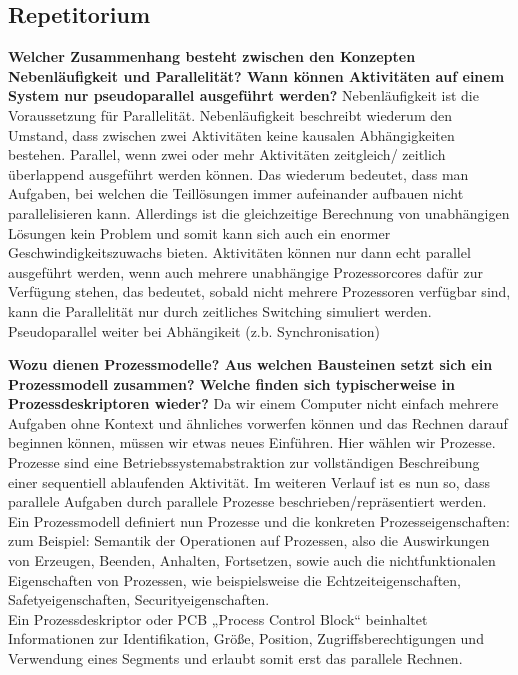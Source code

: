 \documentclass[a4paper]{article}
\begin{document}
\subsection{Repetitorium}
\begin{itemize*}
    \item \textbf{Welcher Zusammenhang besteht zwischen den Konzepten Nebenläufigkeit und Parallelität? Wann können Aktivitäten auf einem System nur pseudoparallel ausgeführt werden?} Nebenläufigkeit ist die Voraussetzung für Parallelität. Nebenläufigkeit beschreibt wiederum den Umstand, dass zwischen zwei Aktivitäten keine kausalen Abhängigkeiten bestehen. Parallel, wenn zwei oder mehr Aktivitäten zeitgleich/ zeitlich überlappend ausgeführt werden können. Das wiederum bedeutet, dass man Aufgaben, bei welchen die Teillösungen immer aufeinander aufbauen nicht parallelisieren kann. Allerdings ist die gleichzeitige Berechnung von unabhängigen Lösungen kein Problem und somit kann sich auch ein enormer Geschwindigkeitszuwachs bieten. Aktivitäten können nur dann echt parallel ausgeführt werden, wenn auch mehrere unabhängige Prozessorcores dafür zur Verfügung stehen, das bedeutet, sobald nicht mehrere Prozessoren verfügbar sind, kann die Parallelität nur durch zeitliches Switching simuliert werden. Pseudoparallel weiter bei Abhängikeit (z.b. Synchronisation)
    \item \textbf{Wozu dienen Prozessmodelle? Aus welchen Bausteinen setzt sich ein Prozessmodell zusammen? Welche finden sich typischerweise in Prozessdeskriptoren wieder?} Da wir einem Computer nicht einfach mehrere Aufgaben ohne Kontext und ähnliches vorwerfen können und das Rechnen darauf beginnen können, müssen wir etwas neues Einführen. Hier wählen wir Prozesse. Prozesse sind eine Betriebssystemabstraktion zur vollständigen Beschreibung einer sequentiell ablaufenden Aktivität. Im weiteren Verlauf ist es nun so, dass parallele Aufgaben durch parallele Prozesse beschrieben/repräsentiert werden. \\
    Ein Prozessmodell definiert nun Prozesse und die konkreten Prozesseigenschaften: zum Beispiel: Semantik der Operationen auf Prozessen, also die Auswirkungen von Erzeugen, Beenden, Anhalten, Fortsetzen, sowie auch die nichtfunktionalen Eigenschaften von Prozessen, wie beispielsweise die Echtzeiteigenschaften, Safetyeigenschaften, Securityeigenschaften.\\
    Ein Prozessdeskriptor oder PCB „Process Control Block“ beinhaltet Informationen zur Identifikation, Größe, Position, Zugriffsberechtigungen und Verwendung eines Segments und erlaubt somit erst das parallele Rechnen.\\

\end{itemize*}
\end{document}
